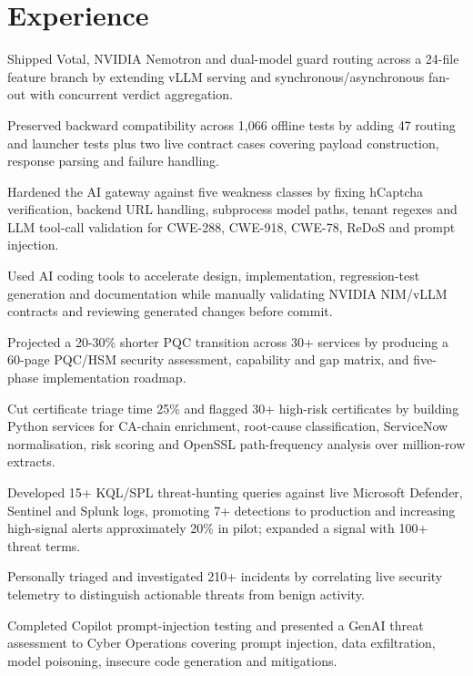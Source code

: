 \section{Experience}

\begin{resumeBullets}
  \item Shipped Votal, NVIDIA Nemotron and dual-model guard routing across a 24-file feature branch by extending vLLM serving and synchronous/asynchronous fan-out with concurrent verdict aggregation.
  \item Preserved backward compatibility across 1,066 offline tests by adding 47 routing and launcher tests plus two live contract cases covering payload construction, response parsing and failure handling.
  \item Hardened the AI gateway against five weakness classes by fixing hCaptcha verification, backend URL handling, subprocess model paths, tenant regexes and LLM tool-call validation for CWE-288, CWE-918, CWE-78, ReDoS and prompt injection.
  \item Used AI coding tools to accelerate design, implementation, regression-test generation and documentation while manually validating NVIDIA NIM/vLLM contracts and reviewing generated changes before commit.
\end{resumeBullets}

\begin{resumeBullets}
  \item Projected a 20-30\% shorter PQC transition across 30+ services by producing a 60-page PQC/HSM security assessment, capability and gap matrix, and five-phase implementation roadmap.
  \item Cut certificate triage time 25\% and flagged 30+ high-risk certificates by building Python services for CA-chain enrichment, root-cause classification, ServiceNow normalisation, risk scoring and OpenSSL path-frequency analysis over million-row extracts.
  \item Developed 15+ KQL/SPL threat-hunting queries against live Microsoft Defender, Sentinel and Splunk logs, promoting 7+ detections to production and increasing high-signal alerts approximately 20\% in pilot; expanded a signal with 100+ threat terms.
  \item Personally triaged and investigated 210+ incidents by correlating live security telemetry to distinguish actionable threats from benign activity.
  \item Completed Copilot prompt-injection testing and presented a GenAI threat assessment to Cyber Operations covering prompt injection, data exfiltration, model poisoning, insecure code generation and mitigations.
\end{resumeBullets}

